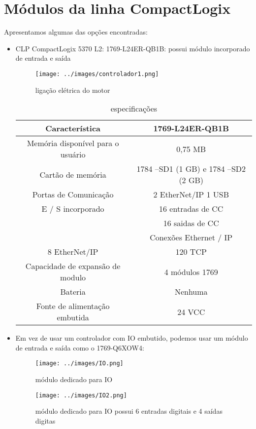 \section{Módulos da linha CompactLogix}
Apresentamos algumas das opções encontradas:
\begin{itemize}
	\item CLP CompactLogix 5370 L2: 1769-L24ER-QB1B: possui módulo incorporado de entrada e saída
	\begin{figure}[H]
	\centering
	\texttt{[image: ../images/controlador1.png]}
	\caption{ligação elétrica do motor}
\end{figure}

\begin{table}[H]
	\centering 
	\begin{tabular}{|c|c|}\hline
	Característica & 
1769-L24ER-QB1B\\ \hline

Memória disponível para o usuário &
0,75 MB \\ \hline

Cartão de memória &
1784 –SD1 (1 GB) e 1784 –SD2 (2 GB) \\ \hline

Portas de Comunicação &
2 EtherNet/IP
1 USB \\ \hline

E / S incorporado &
16 entradas de CC \\ &
16 saidas de CC \\ &
Conexões Ethernet / IP 
\\ \hline

8 EtherNet/IP &
120 TCP
\\ \hline

Capacidade de expansão de modulo &
4 módulos 1769
\\ \hline

Bateria & 
Nenhuma
\\ \hline
Fonte de alimentação embutida &
24 VCC\\ \hline
	\end{tabular}
	\caption{especificações }
\end{table}
	


\item Em vez de usar um controlador com IO embutido, podemos usar um módulo de entrada e saída como o  1769-Q6XOW4:

	\begin{figure}[H]
	\centering
	\texttt{[image: ../images/IO.png]}
	\caption{módulo dedicado para IO}
	\end{figure}
	
		\begin{figure}[H]
	\centering
	\texttt{[image: ../images/IO2.png]}
	\caption{módulo dedicado para IO possui 6 entradas digitais e 4 saídas digitas}
	\end{figure}
\end{itemize}
